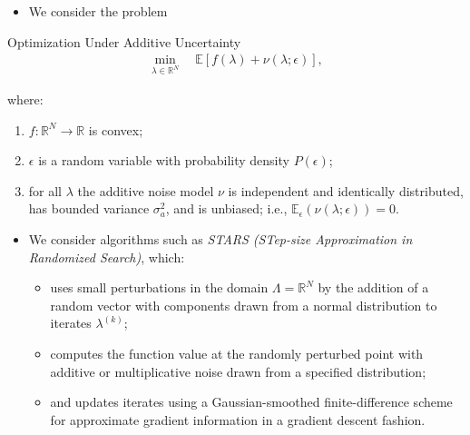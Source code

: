 \documentclass[11pt]{beamer}
\newcommand{\R}{\mathbb{R}}
\begin{document}
\begin{frame}

\begin{itemize}
	
	
	\item We consider the problem

\end{itemize}

\begin{block}{Optimization Under Additive Uncertainty \footnotemark[1]}
\begin{eqnarray} \label{eq:9}
\min_{\lambda \in \R^N} \quad \mathbb{E}\left[f(\lambda)+\nu (\lambda; \epsilon)\right],
\end{eqnarray} 

\noindent where:

\begin{enumerate}[(i.)]

\item $f: \R^N \to \R$ is convex;

\item $\epsilon$ is a random variable with probability density $P(\epsilon)$;

\item for all $\lambda$ the additive noise model $\nu$ is independent and identically distributed, has bounded variance $\sigma_a^2$, and is unbiased; i.e., $\mathbb{E}_\epsilon (\nu(\lambda;\epsilon))=0$.

\end{enumerate}

\end{block}


\end{frame}


\begin{frame}

\begin{itemize}

	\item We consider algorithms such as \textit{STARS \footnotemark[1] (STep-size Approximation in Randomized Search)}, which: 

\begin{itemize}
		\item uses small perturbations in the domain $\Lambda=\R^N$ by the addition of a random vector with components drawn from a normal distribution to iterates $\lambda^{(k)}$; 
		\item computes the function value at the randomly perturbed point with additive or multiplicative noise drawn from a specified distribution; 
		\item and updates iterates using a Gaussian-smoothed finite-difference scheme for approximate gradient information in a gradient descent fashion. 

\end{itemize}

\end{itemize}


\end{frame}
\end{document}

